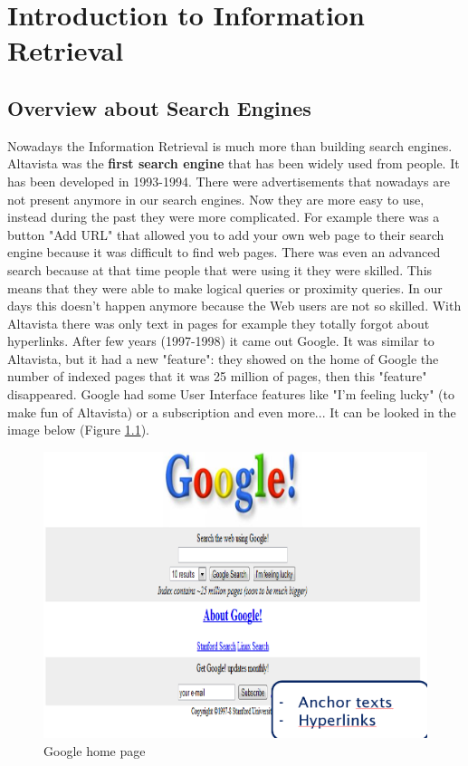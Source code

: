 \chapter{Introduction to Information Retrieval}
\section{Overview about Search Engines}
Nowadays the Information Retrieval is much more than building search engines.\newline 
Altavista was the \textbf{first search engine} that has been widely used from people. It has been developed in 1993-1994.\newline
There were advertisements that nowadays are not present anymore in our search engines. Now they are more easy to use, instead during the past they were more complicated.\newline
For example there was a button "Add URL" that allowed you to add your own web page to their search engine because it was difficult to find web pages. There was even an advanced search because at that time people that were using it they were skilled. This means that they were able to make logical queries or proximity queries. In our days this doesn't happen anymore because the Web users are not so skilled. With Altavista there was only text in pages for example they totally forgot about hyperlinks.\newline
After few years (1997-1998) it came out Google. It was similar to Altavista, but it had a new "feature": they showed on the home of Google the number of indexed pages that it was 25 million of pages, then this "feature" disappeared.\newline
Google had some User Interface features like "I'm feeling lucky" (to make fun of Altavista) or a subscription and even more...
It can be looked in the image below (Figure \ref{fig:googlehomepage}).\newline \newline
\begin{figure}
    \centering
    \includegraphics[width=0.65\linewidth]{images/googlehomepage.png}
    \caption{Google home page}
    \label{fig:googlehomepage}
\end{figure}
